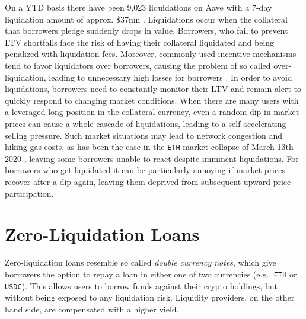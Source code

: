 \documentclass[a4paper]{article}
\begin{document}
On a YTD basis there have been 9,023 liquidations on Aave with a 7-day liquidation amount of approx. \$37mn \cite{dune}. Liquidations occur when the collateral that borrowers pledge suddenly drops in value. Borrowers, who fail to prevent LTV shortfalls face the risk of having their collateral liquidated and being penalized with liquidation fees. Moreover, commonly used incentive mechanisms tend to favor liquidators over borrowers, causing the problem of so called over-liquidation, leading to unnecessary high losses for borrowers \cite{qin}. In order to avoid liquidations, borrowers need to constantly monitor their LTV and remain alert to quickly respond to changing market conditions. When there are many users with a leveraged long position in the collateral currency, even a random dip in market prices can cause a whole cascade of liquidations, leading to a self-accelerating selling pressure. Such market situations may lead to network congestion and hiking gas costs, as has been the case in the \verb|ETH| market collapse of March 13th 2020 \cite{qin}, leaving some borrowers unable to react despite imminent liquidations. For borrowers who get liquidated it can be particularly annoying if market prices recover after a dip again, leaving them deprived from subsequent upward price participation.\\



\section{Zero-Liquidation Loans}
\label{sec:zero_liquidation_loans}
Zero-liquidation loans resemble so called \emph{double currency notes}, which give borrowers the option to repay a loan in either one of two currencies (e.g., \verb|ETH| or \verb|USDC|). This allows users to borrow funds against their crypto holdings, but without being exposed to any liquidation risk. Liquidity providers, on the other hand side, are compensated with a higher yield.\\
\end{document}
